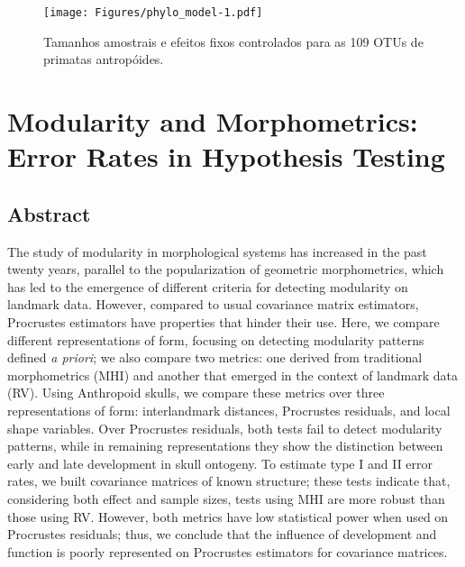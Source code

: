 \documentclass[12pt,twoside]{report}
\begin{document}


\begin{figure}[htbp]
\centering
\texttt{[image: Figures/phylo\_model-1.pdf]}
\caption{Tamanhos amostrais e efeitos fixos controlados para as 109 OTUs
de primatas antropóides. \label{fig:phylo_model}}
\end{figure}

\def\sectionautorefname{Section} \def\chapterautorefname{Chapter}
\def\figureautorefname{Figure} \def\tableautorefname{Table}


\newpage
\chapter{Modularity and Morphometrics: Error Rates in Hypothesis Testing}
\label{ch:modcomp}

\section{Abstract}\label{abstract}

The study of modularity in morphological systems has increased in the
past twenty years, parallel to the popularization of geometric
morphometrics, which has led to the emergence of different criteria for
detecting modularity on landmark data. However, compared to usual
covariance matrix estimators, Procrustes estimators have properties that
hinder their use. Here, we compare different representations of form,
focusing on detecting modularity patterns defined \emph{a priori}; we
also compare two metrics: one derived from traditional morphometrics
(MHI) and another that emerged in the context of landmark data (RV).
Using Anthropoid skulls, we compare these metrics over three
representations of form: interlandmark distances, Procrustes residuals,
and local shape variables. Over Procrustes residuals, both tests fail to
detect modularity patterns, while in remaining representations they show
the distinction between early and late development in skull ontogeny. To
estimate type I and II error rates, we built covariance matrices of
known structure; these tests indicate that, considering both effect and
sample sizes, tests using MHI are more robust than those using RV.
However, both metrics have low statistical power when used on Procrustes
residuals; thus, we conclude that the influence of development and
function is poorly represented on Procrustes estimators for covariance
matrices.
\end{document}
